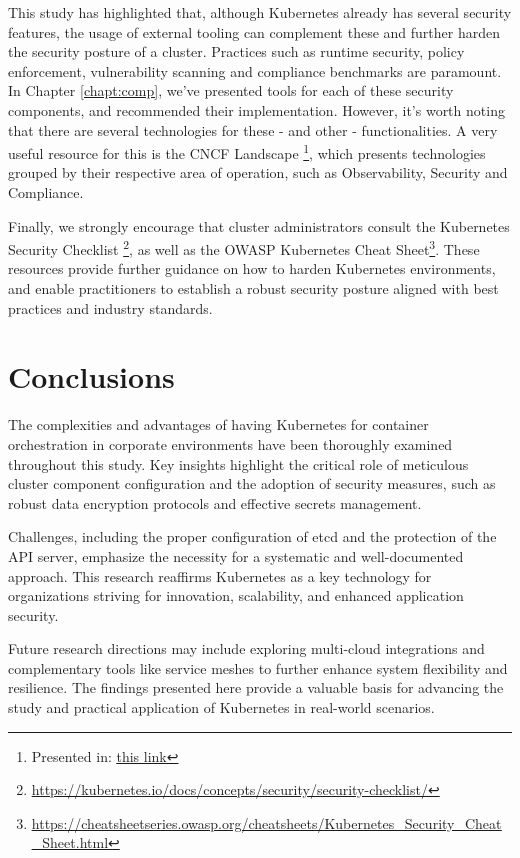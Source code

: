 \documentclass[a4paper,11pt,openright,BCOR=15mm]{scrbook}
\begin{document}
This study has highlighted that, although Kubernetes already has several security features, the usage of external tooling can complement these and further harden the security posture of a cluster. Practices such as runtime security, policy enforcement, vulnerability scanning and compliance benchmarks are paramount. In Chapter \ref{chapt:comp}, we've presented tools for each of these security components, and recommended their implementation. However, it's worth noting that there are several technologies for these - and other - functionalities. A very useful resource for this is the CNCF Landscape \footnote{Presented in: \href{https://landscape.cncf.io/}{\underline{this link}}}, which presents technologies grouped by their respective area of operation, such as Observability, Security and Compliance.

Finally, we strongly encourage that cluster administrators consult the Kubernetes Security Checklist \footnote{\href{https://kubernetes.io/docs/concepts/security/security-checklist/}{\underline{https://kubernetes.io/docs/concepts/security/security-checklist/}}}, as well as the OWASP Kubernetes Cheat Sheet\footnote{\href{https://cheatsheetseries.owasp.org/cheatsheets/Kubernetes_Security_Cheat_Sheet.html}{\underline{https://cheatsheetseries.owasp.org/cheatsheets/Kubernetes\_Security\_Cheat\_Sheet.html}}}. These resources provide further guidance on how to harden Kubernetes environments, and enable practitioners to establish a robust security posture aligned with best practices and industry standards.


	\chapter{Conclusions }
The complexities and advantages of having Kubernetes for container orchestration in corporate environments have been thoroughly examined throughout this study. Key insights highlight the critical role of meticulous cluster component configuration and the adoption of security measures, such as robust data encryption protocols and effective secrets management.

Challenges, including the proper configuration of etcd and the protection of the API server, emphasize the necessity for a systematic and well-documented approach. This research reaffirms Kubernetes as a key technology for organizations striving for innovation, scalability, and enhanced application security.

Future research directions may include exploring multi-cloud integrations and complementary tools like service meshes to further enhance system flexibility and resilience. The findings presented here provide a valuable basis for advancing the study and practical application of Kubernetes in real-world scenarios.




%	
%	
%	
	
	\printbibliography[heading=bibintoc]
	
	
\end{document}
